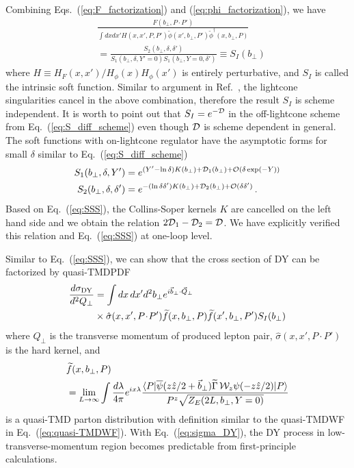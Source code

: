 \documentclass[twocolumn,aps,preprintnumbers,prd,superscriptaddress,10pt]{revtex4-1}
\begin{document}
Combining Eqs.~(\ref{eq:F_factorization}) and (\ref{eq:phi_factorization}), we have
\begin{align}\label{eq:SSS}
&\frac{F(b_\perp,P\!\cdot\!P')}{\int dx dx' H(x,x',P,P')\widetilde\phi(x',b_\perp,P')\widetilde\phi^\dagger(x,b_\perp,P)}\nonumber \\
&=\frac{S_2(b_\perp,\delta,\delta')}{S_1(b_\perp,\delta,Y'=0) S_1(b_\perp,Y=0,\delta')}\equiv S_I(b_\perp)
\end{align}
where $H\equiv H_F(x,x')/H_\phi(x)H_\phi(x')$ is entirely
perturbative, and $S_I$ is called the intrinsic soft function. Similar to argument in Ref.~\cite{Collins:2011zzd}, the lightcone singularities cancel in the above combination, therefore the
result $S_I$ is scheme independent.
%
It is worth to point out that $S_I=e^{-\cal D}$ in the off-lightcone scheme from Eq.~(\ref{eq:S_diff_scheme}) even though $\cal D$ is scheme dependent in general.
%
The soft functions with on-lightcone regulator have the asymptotic forms for small $\delta$ similar to Eq.~(\ref{eq:S_diff_scheme})
\begin{align}\label{eq:S_on-lightcone}
S_1(b_\perp,\delta,Y')&=e^{(Y'-\ln \delta)K(b_\perp)+{\cal D}_1(b_\perp)+{\cal O}(\delta \exp(-Y))}\\
S_2(b_\perp,\delta,\delta')&=e^{-(\ln\delta\delta')K(b_\perp)+{\cal D}_2(b_\perp)+{\cal O}(\delta\delta')}\, .
\end{align}
%
Based on Eq.~(\ref{eq:SSS}), the Collins-Soper kernels $K$ are cancelled on the left hand side and we obtain the relation $2{\cal D}_1-{\cal D}_2={\cal D}$.
%
We have explicitly verified this relation and Eq.~(\ref{eq:SSS}) at one-loop level.


Similar to Eq.~(\ref{eq:SSS}), we can show that the cross section of DY can be factorized by quasi-TMDPDF~\cite{future}
\begin{align}\label{eq:sigma_DY}
\frac{d\sigma_{\rm DY}}{d^2 Q_\perp}&=\int dx\, dx' d^2 b_\perp e^{i\vec b_\perp \cdot \vec Q_\perp}\\
&\times\hat \sigma(x,x',P\!\cdot\! P')\widetilde f(x,b_\perp,P)\widetilde f(x',b_\perp,P')S_I(b_\perp)\nonumber
\end{align}
where $Q_\perp$ is the transverse momentum of produced lepton pair, $\hat \sigma(x,x',P\!\cdot\! P')$ is the hard kernel, and
\begin{align}
&\widetilde f(x,b_\perp,P)\\
&=\lim_{L\to\infty}\int\frac{d\lambda}{4\pi}e^{ix \lambda}\frac{\langle P|\overline\psi(z \hat z/2+\vec b_\perp)\widetilde \Gamma\,{\cal W}_z\psi(-z \hat z/2)|P\rangle}{P^z\sqrt{Z_E(2L,b_\perp,Y=0)}}\nonumber
\end{align}
is a quasi-TMD parton distribution with definition similar to the quasi-TMDWF in Eq.~(\ref{eq:quasi-TMDWF}).
%
With Eq.~(\ref{eq:sigma_DY}), the DY process in low-transverse-momentum region becomes predictable from first-principle calculations.\\
\end{document}
